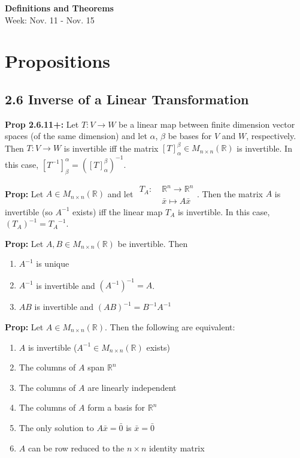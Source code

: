 \noindent
\textbf{\LARGE Definitions and Theorems} \\
\large Week: Nov. 11 - Nov. 15

\normalsize

\section*{Propositions}

\subsection*{2.6 Inverse of a Linear Transformation}

\textbf{Prop 2.6.11+:} Let $T: V \rightarrow W$ be a linear map between finite dimension vector spaces (of the same dimension) and let $\alpha$, $\beta$ be bases for $V$ and $W$, respectively. 
Then $T: V \rightarrow W$ is invertible iff the matrix $[T]_\alpha^\beta \in M_{n \times n}(\mathbb{R})$ is invertible. In this case, $[T^{-1}]^\alpha_\beta = ([T]_\alpha^\beta)^{-1}$.

\bigskip

\noindent
\textbf{Prop:} Let $A \in M_{n \times n}(\mathbb{R})$ and let 
$ \begin{aligned}
    T_A: \; &\mathbb{R}^n \rightarrow \mathbb{R}^n \\
    &\bar x \longmapsto A\bar x
\end{aligned}$.
Then the matrix $A$ is invertible (so $A^{-1}$ exists) iff the linear map $T_A$ is invertible. In this case, $(T_A)^{-1} = {T_A}^{-1}$.

\bigskip 

\noindent 
\textbf{Prop:} Let $A, B \in M_{n \times n}(\mathbb{R})$ be invertible. Then 
\begin{enumerate}
    \item $A^{-1}$ is unique 
    \item $A^{-1}$ is invertible and $(A^{-1})^{-1} = A$. 
    \item $AB$ is invertible and $(AB)^{-1} = B^{-1}A^{-1}$
\end{enumerate}

\bigskip

\noindent
\textbf{Prop:} Let $A \in M_{n \times n}(\mathbb{R})$. Then the following are equivalent:
\begin{enumerate}
    \item $A$ is invertible ($A^{-1} \in M_{n \times n}(\mathbb{R})$ exists)
    \item The columns of $A$ span $\mathbb{R}^n$
    \item The columns of $A$ are linearly independent
    \item The columns of $A$ form a basis for $\mathbb{R}^n$
    \item The only solution to $A\bar x = \bar 0$ is $\bar x = \bar 0$
    \item $A$ can be row reduced to the $n \times n$ identity matrix
\end{enumerate}

